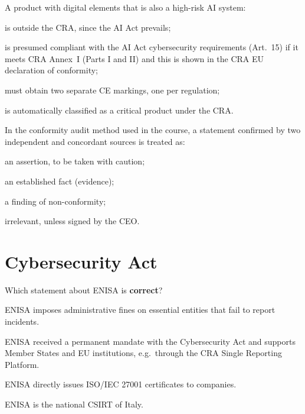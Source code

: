 \begin{domanda}\label{q:cra-ai}
A product with digital elements that is also a high-risk AI system:
\begin{opzioni}
  \item is outside the CRA, since the AI Act prevails;
  \item is presumed compliant with the AI Act cybersecurity requirements (Art.~15) if it meets CRA
    Annex~I (Parts I and II) and this is shown in the CRA EU declaration of conformity;
  \item must obtain two separate CE markings, one per regulation;
  \item is automatically classified as a critical product under the CRA.
\end{opzioni}
\end{domanda}

\begin{domanda}\label{q:fonti}
In the conformity audit method used in the course, a statement confirmed by two independent and
concordant sources is treated as:
\begin{opzioni}
  \item an assertion, to be taken with caution;
  \item an established fact (evidence);
  \item a finding of non-conformity;
  \item irrelevant, unless signed by the CEO.
\end{opzioni}
\end{domanda}

\section{Cybersecurity Act}

\begin{domanda}\label{q:enisa}
Which statement about ENISA is \textbf{correct}?
\begin{opzioni}
  \item ENISA imposes administrative fines on essential entities that fail to report incidents.
  \item ENISA received a permanent mandate with the Cybersecurity Act and supports Member States and EU
    institutions, e.g.\ through the CRA Single Reporting Platform.
  \item ENISA directly issues ISO/IEC 27001 certificates to companies.
  \item ENISA is the national CSIRT of Italy.
\end{opzioni}
\end{domanda}

